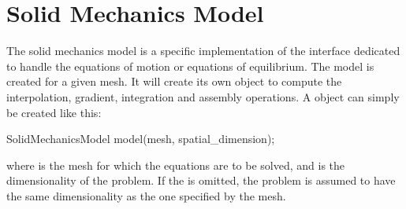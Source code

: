 \section{Solid Mechanics Model}

The  solid mechanics  model is  a  specific implementation  of the  
interface  dedicated  to  handle  the   equations  of  motion  or  equations  of
equilibrium. The  model is  created for a  given mesh.   It will create  its own
  object  to  compute  the interpolation,  gradient,  integration  and
assembly operations.  A   object can simply be created
like this:
\begin{cpp}
  SolidMechanicsModel model(mesh, spatial_dimension);
\end{cpp}
where   is the  mesh for which  the equations  are to be  solved, and
  is  the  dimensionality   of  the  problem.   If  the
 is  omitted, the  problem is assumed  to have  the same
dimensionality as the one specified by the mesh.

